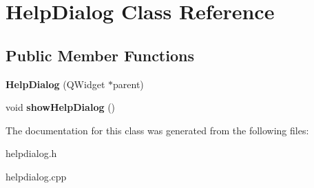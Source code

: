 \hypertarget{classHelpDialog}{
\section{HelpDialog Class Reference}
\label{classHelpDialog}
}
\subsection*{Public Member Functions}
\begin{DoxyCompactItemize}
\item 
\hypertarget{classHelpDialog_a389fcc4cc83a57cb5f716238e8180dcb}{
{\bfseries HelpDialog} (QWidget $\ast$parent)}
\label{classHelpDialog_a389fcc4cc83a57cb5f716238e8180dcb}

\item 
\hypertarget{classHelpDialog_ae1a3374e815e3390fc578685c0d46733}{
void {\bfseries showHelpDialog} ()}
\label{classHelpDialog_ae1a3374e815e3390fc578685c0d46733}

\end{DoxyCompactItemize}


The documentation for this class was generated from the following files:\begin{DoxyCompactItemize}
\item 
helpdialog.h\item 
helpdialog.cpp\end{DoxyCompactItemize}

